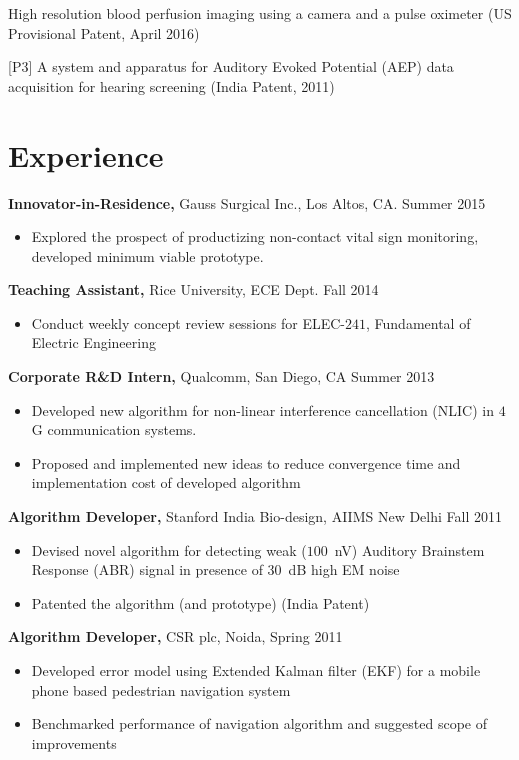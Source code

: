 \documentclass[margin]{res}
\begin{document}
\begin{resume}
[P2] High resolution blood perfusion imaging using a camera and a pulse oximeter (US Provisional Patent, April 2016)

[P3] A system and apparatus for Auditory Evoked Potential (AEP) data acquisition for hearing screening (India Patent, 2011)

\section{Experience}
  {\bf Innovator-in-Residence,} Gauss Surgical Inc., Los Altos, CA.  \hfill Summer  2015
  \begin{itemize} \itemsep -2pt
  \item Explored the prospect of productizing non-contact vital sign monitoring, developed minimum viable prototype. 
  
  \end{itemize}
  
  
 {\bf Teaching Assistant,} Rice University, ECE Dept.  \hfill Fall  2014
 \begin{itemize} \itemsep -2pt  %
 \item Conduct weekly concept review sessions for ELEC-$241$, Fundamental of Electric Engineering 

 \end{itemize}

 {\bf Corporate R\&D Intern,} Qualcomm, San Diego, CA \hfill Summer  2013
 \begin{itemize} \itemsep -2pt  %
 \item Developed new algorithm for non-linear interference cancellation (NLIC) in $4$G communication systems. 
 \item Proposed and implemented new ideas to reduce convergence time and implementation cost of developed algorithm 
 \end{itemize}

{\bf Algorithm Developer,} Stanford India Bio-design, AIIMS New Delhi \hfill Fall 2011
\begin{itemize} \itemsep -2pt %
\item Devised novel algorithm for detecting weak ($100$~nV) Auditory Brainstem Response (ABR) signal in presence of $30$~dB high EM noise
\item Patented the algorithm (and prototype) (India Patent)
 
\end{itemize}


{\bf Algorithm Developer,} CSR plc, Noida,  \hfill
Spring 2011
\begin{itemize} \itemsep -2pt
 \item Developed error model using Extended Kalman filter (EKF) for a mobile phone based pedestrian navigation system
 \item Benchmarked performance of navigation algorithm and suggested scope of improvements


\end{itemize}
\end{resume}
\end{document}
